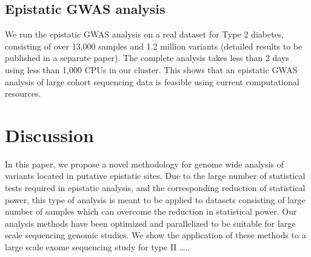 \subsection{Epistatic GWAS analysis}

We run the epistatic GWAS analysis on a real dataset for Type 2 diabetes, consisting of over 13,000 samples and 1.2 million variants (detailed results to be published in a separate paper). The complete analysis takes less than 2 days using less than 1,000 CPUs in our cluster. This shows that an epistatic GWAS analysis of large cohort sequencing data is feasible using current computational resources.

\section{Discussion}

In this paper, we propose a novel methodology for genome wide analysis of variants located in putative epistatic sites. Due to the large number of statistical tests required in epistatic analysis, and the corresponding reduction of statistical power, this type of analysis is meant to be applied to datasets consisting of large number of samples which can overcome the reduction in statistical power. Our analysis methods have been optimized and parallelized to be suitable for large scale sequencing genomic studies.
We show the application of these methods to a large scale exome sequencing study for type II …..


